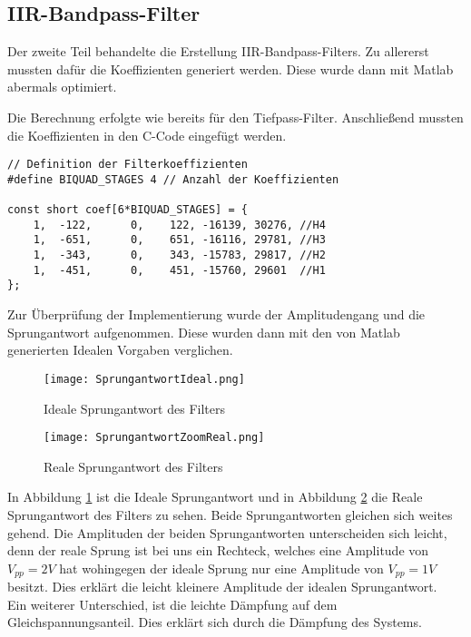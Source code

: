 \subsection*{IIR-Bandpass-Filter}
Der zweite Teil behandelte die Erstellung IIR-Bandpass-Filters. Zu allererst mussten dafür die Koeffizienten generiert werden. Diese wurde dann mit Matlab abermals optimiert.


Die Berechnung erfolgte wie bereits für den Tiefpass-Filter. Anschließend mussten die Koeffizienten in den C-Code eingefügt werden.\\
\begin{adjustbox}{width=\textwidth, keepaspectratio} 
  \label{code:procdataKompFIR}
  \begin{lstlisting}[title=Codeausschnitt der modifizierten process\_data.c]
// Definition der Filterkoeffizienten
#define BIQUAD_STAGES 4 // Anzahl der Koeffizienten

const short coef[6*BIQUAD_STAGES] = {
	1,  -122,	   0,	 122, -16139, 30276, //H4
	1,  -651,      0,	 651, -16116, 29781, //H3
	1,  -343,      0,	 343, -15783, 29817, //H2
	1,  -451,	   0,	 451, -15760, 29601  //H1
};
  \end{lstlisting}
\end{adjustbox}

Zur Überprüfung der Implementierung wurde der Amplitudengang und die Sprungantwort aufgenommen. Diese wurden dann mit den von Matlab generierten Idealen Vorgaben verglichen.
\begin{figure}[H]
  \centering
    \texttt{[image: SprungantwortIdeal.png]}
  \caption{Ideale Sprungantwort des Filters}
  \label{fig:SprungBandIdeal}
\end{figure}
\begin{figure}[H]
  \centering
    \texttt{[image: SprungantwortZoomReal.png]}
  \caption{Reale Sprungantwort des Filters}
  \label{fig:SprungBandReal}
\end{figure}

In Abbildung \ref{fig:SprungBandIdeal} ist die Ideale Sprungantwort und in Abbildung \ref{fig:SprungBandReal} die Reale Sprungantwort des Filters zu sehen.
Beide Sprungantworten gleichen sich weites gehend. Die Amplituden der beiden Sprungantworten unterscheiden sich leicht, denn der reale Sprung ist bei uns ein Rechteck, welches eine Amplitude von \begin{math} V_{pp} = 2V \end{math} hat wohingegen der ideale Sprung nur eine Amplitude von \begin{math} V_{pp} = 1V \end{math} besitzt. Dies erklärt die leicht kleinere Amplitude der idealen Sprungantwort.\\ Ein weiterer Unterschied, ist die leichte Dämpfung auf dem Gleichspannungsanteil. Dies erklärt sich durch die Dämpfung des Systems.

